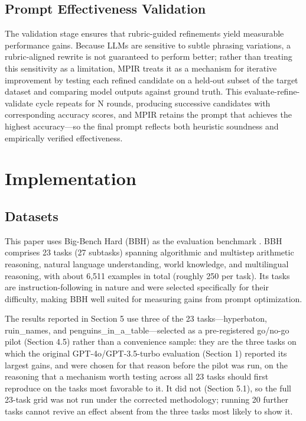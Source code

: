 \documentclass[a4paper,fleqn]{cas-sc}
\begin{document}
\subsection{Prompt Effectiveness Validation}

The validation stage ensures that rubric-guided refinements yield measurable performance gains. Because LLMs are sensitive to subtle phrasing variations, a rubric-aligned rewrite is not guaranteed to perform better; rather than treating this sensitivity as a limitation, MPIR treats it as a mechanism for iterative improvement by testing each refined candidate on a held-out subset of the target dataset and comparing model outputs against ground truth. This evaluate-refine-validate cycle repeats for N rounds, producing successive candidates with corresponding accuracy scores, and MPIR retains the prompt that achieves the highest accuracy---so the final prompt reflects both heuristic soundness and empirically verified effectiveness.

\section{Implementation}

\subsection{Datasets}

This paper uses Big-Bench Hard (BBH) as the evaluation benchmark \citep{suzgun2023}. BBH comprises 23 tasks (27 subtasks) spanning algorithmic and multistep arithmetic reasoning, natural language understanding, world knowledge, and multilingual reasoning, with about 6,511 examples in total (roughly 250 per task). Its tasks are instruction-following in nature and were selected specifically for their difficulty, making BBH well suited for measuring gains from prompt optimization.

The results reported in Section 5 use three of the 23 tasks---hyperbaton, ruin\_\allowbreak{}names, and penguins\_\allowbreak{}in\_\allowbreak{}a\_\allowbreak{}table---selected as a pre-registered go/no-go pilot (Section 4.5) rather than a convenience sample: they are the three tasks on which the original GPT-4o/GPT-3.5-turbo evaluation (Section 1) reported its largest gains, and were chosen for that reason before the pilot was run, on the reasoning that a mechanism worth testing across all 23 tasks should first reproduce on the tasks most favorable to it. It did not (Section 5.1), so the full 23-task grid was not run under the corrected methodology; running 20 further tasks cannot revive an effect absent from the three tasks most likely to show it.
\end{document}
